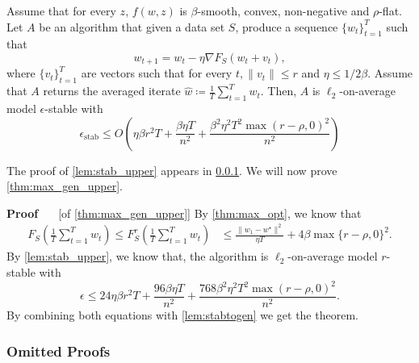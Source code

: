 \documentclass[11pt]{article}
\newcommand{\fsmax}{F_S^{\rad}}
\newcommand{\rad}{r}
\renewenvironment{proof}[1][]{%
  \par\noindent\textbf{\upshape Proof%
  \if\relax\detokenize{#1}\relax\else\ #1\fi}\ %
}{\jmlrQED}
\begin{document}
\begin{lemma}
    \label{lem:stab_upper}
Assume that for every $z$, $f(w,z)$ is $\beta$-smooth, convex, non-negative and $\rho$-flat. Let $A$ be an algorithm that given a data set $S$, produce a sequence $\{w_t\}_{t=1}^T$ such that $$
w_{t+1} = w_t - \eta \nabla F_S(w_t+v_t),$$
 where $\{v_t\}_{t=1}^T$ are vectors such that for every $t$$, \|v_t\|\leq \rad$ and $\eta\leq 1/2\beta$. Assume that $A$ returns the averaged iterate $\widehat{w} \coloneqq \frac{1}{T}\sum_{t=1}^T w_t$. Then, $A$ is $\ell_2$-on-average model $\epsilon$-stable with 
$$\epsilon_{\text{stab}}\leq O\left(\eta \beta \rad  ^2  T+ \frac{\beta\eta T}{n^2} + \frac{\beta^2\eta^2 T^2 \max(\rad-\rho,0)^2}{n^2}\right)$$
\end{lemma}
The proof of \cref{lem:stab_upper} appears in \cref{sec:proof_omitted_max_gen_upper}. We will now prove \cref{thm:max_gen_upper}.

\begin{proof} [of \cref{thm:max_gen_upper}]
By \cref{thm:max_opt}, we know that
\begin{align*}
    F_S\left(\frac{1}{T}\sum_{t=1}^T w_t\right)\leq \fsmax\left(\frac{1}{T}\sum_{t=1}^T w_t\right)
    &\leq
    \frac{\|w_1-w^\star\|^2}{\eta T} + 4\beta\max\{\rad - \rho, 0\}^2
    .
\end{align*}
By \cref{lem:stab_upper}, we know that,  the algorithm is $\ell_2$-on-average model $\rad$-stable with 
$$\epsilon\leq 24\eta \beta \rad  ^2  T+ \frac{96\beta\eta T}{n^2} + \frac{768\beta^2\eta^2 T^2 \max(\rad-\rho,0)^2}{n^2}.$$
By combining both equations with \cref{lem:stabtogen} we get the theorem.
\end{proof}

\subsubsection{Omitted Proofs}\label{sec:proof_omitted_max_gen_upper}
\end{document}
